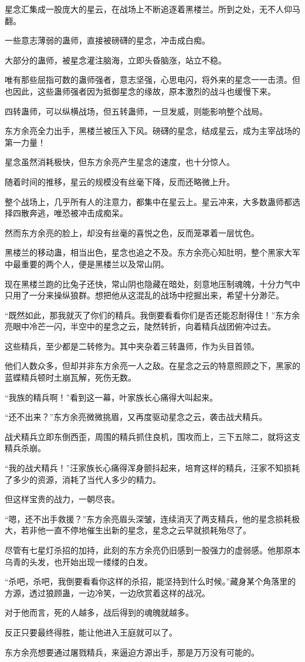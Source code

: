\begin{this_body}
星念汇集成一股庞大的星云，在战场上不断追逐着黑楼兰。所到之处，无不人仰马翻。

一些意志薄弱的蛊师，直接被磅礴的星念，冲击成白痴。

大部分的蛊师，被星念灌注脑海，立即头昏脑涨，站立不稳。

唯有那些屈指可数的蛊师强者，意志坚强，心思电闪，将外来的星念一一击溃。但也因此，这些蛊师强者因为抵御星念的缘故，原本激烈的战斗也缓慢下来。

四转蛊师，可以纵横战场，但五转蛊师，一旦发威，则能影响整个战局。

东方余亮全力出手，黑楼兰被压入下风。磅礴的星念，结成星云，成为主宰战场的第一力量！

星念虽然消耗极快，但东方余亮产生星念的速度，也十分惊人。

随着时间的推移，星云的规模没有丝毫下降，反而还略微上升。

整个战场上，几乎所有人的注意力，都集中在星云上。星云冲来，大多数蛊师都选择四散奔逃，唯恐被冲击成痴呆。

然而东方余亮的脸上，却没有丝毫的喜悦之色，反而笼罩着一层忧色。

黑楼兰的移动蛊，相当出色，星念也追之不及。东方余亮心知肚明，整个黑家大军中最重要的两个人，便是黑楼兰以及常山阴。

现在黑楼兰跑的比兔子还快，常山阴也隐藏在暗处，刻意地压制魂魄，十分力气中只用了一分来操纵狼群。想把他从这混乱的战场中挖掘出来，希望十分渺茫。

“既然如此，那我就灭了你们的精兵。我倒要看看你们是否还能忍耐得住！”东方余亮眼中冷芒一闪，半空中的星念之云，陡然转折，向着精兵战团俯冲过去。

这些精兵，至少都是二转修为。其中夹杂着三转蛊师，作为头目首领。

他们人数众多，但却并非东方余亮一人之敌。在星念之云的特意照顾之下，黑家的蓝蝶精兵顿时土崩瓦解，死伤无数。

“我族的精兵啊！”看到这一幕，叶家族长心痛得大叫起来。

“还不出来？”东方余亮微微挑眉，又再度驱动星念之云，袭击战犬精兵。

战犬精兵立即东倒西歪，周围的精兵抓住良机，围攻而上，三下五除二，就将这支精兵杀崩。

“我的战犬精兵！”汪家族长心痛得浑身颤抖起来，培育这样的精兵，汪家不知损耗了多少的资源，消耗了当代人多少的精力。

但这样宝贵的战力，一朝尽丧。

“嗯，还不出手救援？”东方余亮眉头深皱，连续消灭了两支精兵，他的星念损耗极大，若非他一直不停地催生出新的星念，星念之云早就损耗殆尽了。

尽管有七星灯杀招的加持，此刻的东方余亮仍旧感到一股强力的虚弱感。他那原本乌青的头发，也开始出现一缕缕的白发。

“杀吧，杀吧，我倒要看看你这样的杀招，能坚持到什么时候。”藏身某个角落里的方源，透过狼顾蛊，一边冷笑，一边欣赏着这样的战况。

对于他而言，死的人越多，战后得到的魂魄就越多。

反正只要最终得胜，能让他进入王庭就可以了。

东方余亮想要通过屠戮精兵，来逼迫方源出手，那是万万没有可能的。

\end{this_body}

